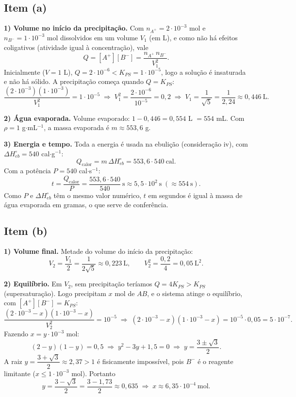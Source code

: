 \documentclass{article}%
\begin{document}
\subsection*{Item (a)}

\textbf{1) Volume no início da precipitação.} Com $n_{A^+}=2\cdot10^{-3}$ mol e $n_{B^-}=1\cdot10^{-3}$ mol dissolvidos em um volume $V_1$ (em L), e como não há efeitos coligativos (atividade igual à concentração), vale
\[
Q=[A^+][B^-]=\frac{n_{A^+}\,n_{B^-}}{V_1^{2}} .
\]
Inicialmente ($V=1$ L), $Q=2\cdot10^{-6}<K_{PS}=1\cdot10^{-5}$, logo a solução é insaturada e não há sólido. A precipitação começa quando $Q=K_{PS}$:
\[
\frac{(2\cdot10^{-3})(1\cdot10^{-3})}{V_1^{2}}=1\cdot10^{-5}
\;\Rightarrow\; V_1^{2}=\frac{2\cdot10^{-6}}{10^{-5}}=0{,}2
\;\Rightarrow\; V_1=\frac{1}{\sqrt5}=\frac{1}{2{,}24}\approx 0{,}446\ \text{L}.
\]

\textbf{2) Água evaporada.} Volume evaporado: $1-0{,}446=0{,}554$ L $=554$ mL. Com $\rho=1$ g$\cdot$mL$^{-1}$, a massa evaporada é $m\approx 553{,}6$ g.

\textbf{3) Energia e tempo.} Toda a energia é usada na ebulição (consideração iv), com $\Delta H^\circ_{eb}=540$ cal$\cdot$g$^{-1}$:
\[
Q_{\text{calor}}=m\,\Delta H^\circ_{eb}=553{,}6\cdot 540\ \text{cal}.
\]
Com a potência $P=540$ cal$\cdot$s$^{-1}$:
\[
t=\frac{Q_{\text{calor}}}{P}=\frac{553{,}6\cdot540}{540}\ \text{s}\approx 5{,}5\cdot10^{2}\ \text{s}\;(\approx 554\ \text{s}).
\]
Como $P$ e $\Delta H^\circ_{eb}$ têm o mesmo valor numérico, $t$ em segundos é igual à massa de água evaporada em gramas, o que serve de conferência.

\subsection*{Item (b)}

\textbf{1) Volume final.} Metade do volume do início da precipitação:
\[
V_2=\frac{V_1}{2}=\frac{1}{2\sqrt5}\approx 0{,}223\ \text{L},\qquad V_2^{2}=\frac{0{,}2}{4}=0{,}05\ \text{L}^2 .
\]

\textbf{2) Equilíbrio.} Em $V_2$, sem precipitação teríamos $Q=4K_{PS}>K_{PS}$ (supersaturação). Logo precipitam $x$ mol de $AB$, e o sistema atinge o equilíbrio, com $[A^+][B^-]=K_{PS}$:
\[
\frac{(2\cdot10^{-3}-x)(1\cdot10^{-3}-x)}{V_2^{2}}=10^{-5}
\;\Rightarrow\;(2\cdot10^{-3}-x)(1\cdot10^{-3}-x)=10^{-5}\cdot0{,}05=5\cdot10^{-7}.
\]
Fazendo $x=y\cdot10^{-3}$ mol:
\[
(2-y)(1-y)=0{,}5\;\Rightarrow\; y^{2}-3y+1{,}5=0
\;\Rightarrow\; y=\frac{3\pm\sqrt3}{2}.
\]
A raiz $y=\dfrac{3+\sqrt3}{2}\approx2{,}37>1$ é fisicamente impossível, pois $B^-$ é o reagente limitante ($x\le 1\cdot10^{-3}$ mol). Portanto
\[
y=\frac{3-\sqrt3}{2}=\frac{3-1{,}73}{2}\approx0{,}635\;\Rightarrow\;x\approx6{,}35\cdot10^{-4}\ \text{mol}.
\]
\end{document}
